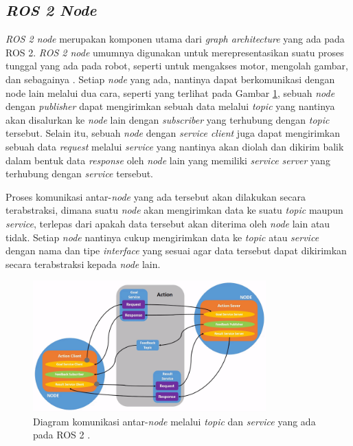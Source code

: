 \subsection{\emph{ROS 2 Node}}
\label{subsec:ros2node}

\emph{ROS 2 node} merupakan komponen utama dari \emph{graph architecture} yang ada pada ROS 2.
\emph{ROS 2 node} umumnya digunakan untuk merepresentasikan suatu proses tunggal yang ada pada robot,
  seperti untuk mengakses motor, mengolah gambar, dan sebagainya \citep{url:understandingros2nodes}.
Setiap \emph{node} yang ada, nantinya dapat berkomunikasi dengan node lain melalui dua cara,
  seperti yang terlihat pada Gambar \ref{fig:diagramnoderos2},
  sebuah \emph{node} dengan \emph{publisher} dapat mengirimkan sebuah data melalui \emph{topic} yang nantinya akan disalurkan ke \emph{node} lain dengan \emph{subscriber} yang terhubung dengan \emph{topic} tersebut.
Selain itu, sebuah \emph{node} dengan \emph{service client} juga dapat mengirimkan sebuah data \emph{request} melalui \emph{service} yang nantinya akan diolah dan dikirim balik dalam bentuk data \emph{response} oleh \emph{node} lain yang memiliki \emph{service server} yang terhubung dengan \emph{service} tersebut.

Proses komunikasi antar-\emph{node} yang ada tersebut akan dilakukan secara terabstraksi,
  dimana suatu \emph{node} akan mengirimkan data ke suatu \emph{topic} maupun \emph{service},
  terlepas dari apakah data tersebut akan diterima oleh \emph{node} lain atau tidak.
Setiap \emph{node} nantinya cukup mengirimkan data ke \emph{topic} atau \emph{service} dengan nama dan tipe \emph{interface} yang sesuai agar data tersebut dapat dikirimkan secara terabstraksi kepada \emph{node} lain.

\begin{figure}
  \centering
  \includegraphics[width=0.8\textwidth,keepaspectratio]{gambar/diagram-node-ros2.png}
  \caption{Diagram komunikasi antar-\emph{node} melalui \emph{topic} dan \emph{service} yang ada pada ROS 2 \citep{url:understandingros2nodes}.}
  \label{fig:diagramnoderos2}
\end{figure}

